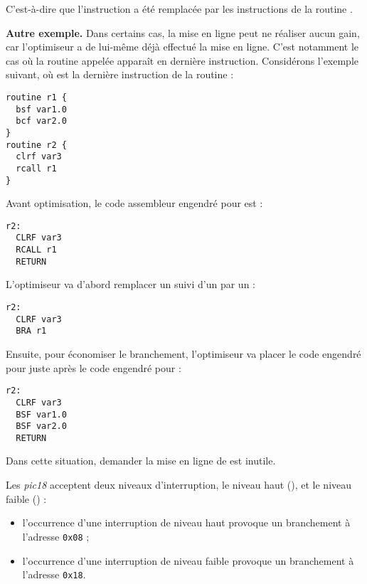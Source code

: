 C'est-à-dire que l'instruction  a été remplacée par les instructions de la routine .

\textbf{Autre exemple.} Dans certains cas, la mise en ligne peut ne réaliser aucun gain, car l'optimiseur a de lui-même déjà effectué la mise en ligne. C'est notamment le cas où la routine appelée apparaît en dernière instruction. Considérons l'exemple suivant, où  est la dernière instruction de la routine  :
\begin{lstlisting}[language=piccolo]
routine r1 {
  bsf var1.0
  bcf var2.0
}
routine r2 {
  clrf var3
  rcall r1
}
\end{lstlisting}

Avant optimisation, le code assembleur engendré pour  est :
\begin{lstlisting}[language=assembleur]
r2:
  CLRF var3
  RCALL r1
  RETURN
\end{lstlisting}

L'optimiseur va d'abord remplacer un  suivi d'un  par un  :
\begin{lstlisting}[language=assembleur]
r2:
  CLRF var3
  BRA r1
\end{lstlisting}

Ensuite, pour économiser le branchement, l'optimiseur va placer le code engendré pour  juste après le code engendré pour  :
\begin{lstlisting}[language=assembleur]
r2:
  CLRF var3
  BSF var1.0
  BSF var2.0
  RETURN
\end{lstlisting}

Dans cette situation, demander la mise en ligne de  est inutile.






Les \emph{pic18} acceptent deux niveaux d’interruption, le niveau haut (), et le niveau faible () :
\begin{itemize}
  \item l’occurrence d’une interruption de niveau haut provoque un branchement à l’adresse \texttt{0x08} ;
  \item l’occurrence d’une interruption de niveau faible provoque un branchement à l’adresse \texttt{0x18}.
\end{itemize}

